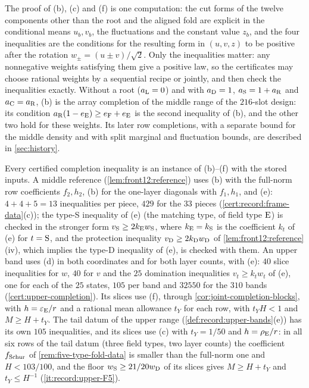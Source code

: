 \begin{remark}\label{rem:five-type-model}
The proof of (b), (c) and (f) is one computation: the cut forms of the twelve
components other than the root and the aligned fold are explicit in the
conditional means $u_b,v_b$, the fluctuations and the constant value $z_b$, and
the four inequalities are the conditions for the resulting form in $(u,v,z)$ to
be positive after the rotation $w_\pm=(u\pm v)/\sqrt2$. Only the inequalities
matter: any nonnegative weights satisfying them give a positive law, so the
certificates may choose rational weights by a sequential recipe or jointly, and
then check the inequalities exactly. Without a root ($a_{\rm L}=0$) and with
$a_{\rm D}=1$, $a_{\rm S}=1+a_{\rm R}$ and $a_{\rm C}=a_{\rm R}$, (b) is the array
completion of the middle range of the $216$-slot design: its condition
$a_{\rm R}(1-e_{\rm E})\ge e_{\rm F}+e_{\rm E}$ is the second inequality of (b),
and the other two hold for these weights. Its later row completions, with a
separate bound for the middle density and with split marginal and fluctuation
bounds, are described in \cref{sec:history}.
\end{remark}

\begin{remark}\label{rem:five-type-certificates}
Every certified completion inequality is an instance of (b)--(f) with the
stored inputs. A middle reference (\cref{lem:front12:reference}) uses
(b) with the full-norm row coefficients $f_2,h_2$, (b) for the one-layer
diagonals with $f_1,h_1$, and (e): $4+4+5=13$ inequalities per piece, $429$ for
the $33$ pieces (\cref{cert:record:frame-data}(c)); the type-S inequality of (e) (the matching type, of field
type ${\rm E}$) is checked in the stronger form
$v_{\rm S}\ge2k_{\rm E}w_{\rm S}$, where $k_{\rm E}=k_{\rm S}$ is the
coefficient $k_t$ of (e) for $t={\rm S}$, and the
protection inequality $v_{\rm D}\ge2k_{\rm D}w_{\rm D}$ of
\cref{lem:front12:reference}(iv), which implies the type-D inequality of (e), is
checked with them. An upper band uses (d) in both coordinates and for both
layer counts, with (e): $40$ slice inequalities for $w$, $40$ for $v$ and the $25$ domination
inequalities $v_t\ge k_tw_t$ of (e), one for each of the $25$ states,
$105$ per band and $32550$ for the $310$ bands
(\cref{cert:upper-completion}). Its slices use (f), through
\cref{cor:joint-completion-blocks}, with $h=\eps_{\rm E}/r$ and a rational mean
allowance $t_Y$ for each row, with $t_YH<1$ and $M\ge H+t_Y$. The
tail datum of the upper range (\cref{def:record:upper-bands}(e)) has its own
$105$ inequalities, and its slices use (c) with $t_Y=1/50$ and
$h=\rho_{\rm E}/r$: in all six rows of the tail datum (three field types, two
layer counts) the coefficient $f_{\rm Schur}$ of \cref{rem:five-type-fold-data} is
smaller than the full-norm one and $H<103/100$, and the floor
$w_{\rm S}\ge\frac{21}{20}w_{\rm D}$ of its slices gives $M\ge H+t_Y$ and
$t_Y\le H^{-1}$ (\ref{it:record:upper-F5}).
\end{remark}

